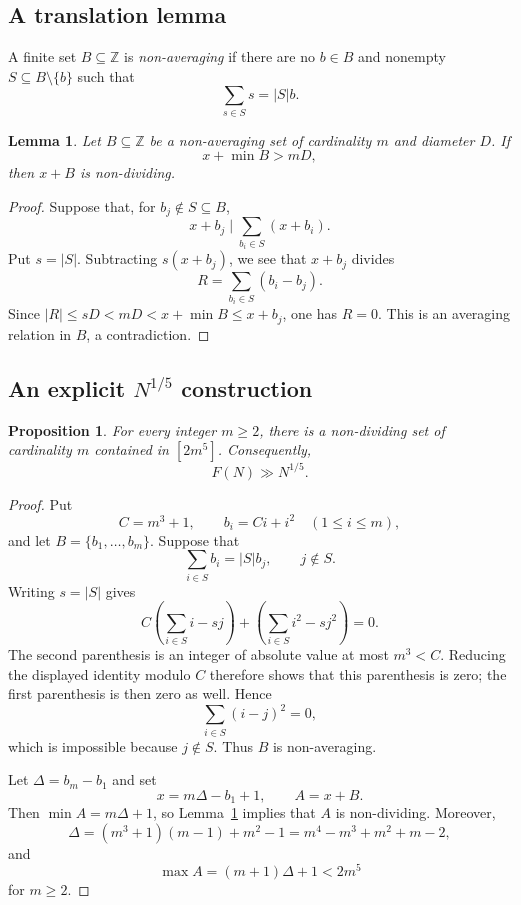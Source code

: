 \documentclass[11pt,reqno]{amsart}
\newtheorem{proposition}[theorem]{Proposition}
\newtheorem{lemma}[theorem]{Lemma}
\theoremstyle{definition}
\theoremstyle{remark}
\newcommand{\Z}{\mathbb Z}
\begin{document}
\subsection{A translation lemma}

A finite set $B\subseteq\Z$ is \emph{non-averaging} if there are no
$b\in B$ and nonempty $S\subseteq B\setminus\{b\}$ such that
\[
 \sum_{s\in S}s=|S|b.
\]

\begin{lemma}
\label{lem:translation}
Let $B\subseteq\Z$ be a non-averaging set of cardinality $m$ and diameter $D$.  If
\[
   x+\min B>mD,
\]
then $x+B$ is non-dividing.
\end{lemma}

\begin{proof}
Suppose that, for $b_j\notin S\subseteq B$,
\[
  x+b_j\mid\sum_{b_i\in S}(x+b_i).
\]
Put $s=|S|$.  Subtracting $s(x+b_j)$, we see that $x+b_j$ divides
\[
  R=\sum_{b_i\in S}(b_i-b_j).
\]
Since $|R|\le sD<mD<x+\min B\le x+b_j$, one has $R=0$.  This is an averaging relation in $B$, a contradiction.
\end{proof}

\subsection{An explicit \texorpdfstring{$N^{1/5}$}{N to the one-fifth} construction}

\begin{proposition}
\label{prop:lower-bound}
For every integer $m\ge2$, there is a non-dividing set of cardinality $m$ contained in $[2m^5]$.  Consequently,
\[
   F(N)\gg N^{1/5}.
\]
\end{proposition}

\begin{proof}
Put
\[
 C=m^3+1,
 \qquad
 b_i=Ci+i^2\quad(1\le i\le m),
\]
and let $B=\{b_1,\dots,b_m\}$.  Suppose that
\[
 \sum_{i\in S}b_i=|S|b_j,
 \qquad j\notin S.
\]
Writing $s=|S|$ gives
\[
 C\left(\sum_{i\in S}i-sj\right)
 +\left(\sum_{i\in S}i^2-sj^2\right)=0.
\]
The second parenthesis is an integer of absolute value at most $m^3<C$.  Reducing the displayed identity modulo $C$ therefore shows that this parenthesis is zero; the first parenthesis is then zero as well.  Hence
\[
 \sum_{i\in S}(i-j)^2=0,
\]
which is impossible because $j\notin S$.  Thus $B$ is non-averaging.

Let $\Delta=b_m-b_1$ and set
\[
  x=m\Delta-b_1+1,
  \qquad
  A=x+B.
\]
Then $\min A=m\Delta+1$, so Lemma~\ref{lem:translation} implies that $A$ is non-dividing.  Moreover,
\[
 \Delta=(m^3+1)(m-1)+m^2-1
       =m^4-m^3+m^2+m-2,
\]
and
\[
 \max A=(m+1)\Delta+1<2m^5
\]
for $m\ge2$.
\end{proof}
\end{document}
